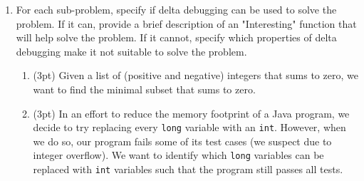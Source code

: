 \documentclass{report}
\newif\ifkey
\newcommand{\answerlong}[1]{\ifkey\color{red}\textbf{#1}\color{black}\else\vspace{0.5in}\fi\xspace}
\newcommand*{\pts}[1]{\addtocounter{points}{#1}(#1pt)}
\begin{document}
\begin{spacing}{1.4}
\begin{enumerate}[leftmargin=*]
\begin{enumerate}
  \item \pts{4} Describe, in one sentence each, two risks associated with Radhia's proposal.\\
    \answerlong{Any two of the following sentences would be a good answer (other answers are possible).
      Reducing integration testing may increase the risk that bugs at the boundary between modules are not detected.
      Static analysis may produce too many false positive alarms.
      Static analysis may be unsound or may miss bugs (even of the kind it is supposed to find).
      Static analysis errors may be too hard to understand.
    }
    \end{enumerate}

  \item For each sub-problem, specify if delta debugging can be used
    to solve the problem. If it can, provide a brief description of an "Interesting" function that will help solve the problem. If it
    cannot, specify which properties of delta debugging make it not suitable to solve the problem.
    \begin{enumerate}

    \item \pts{3} Given a list of (positive and negative) integers that sums to zero, we want to find the minimal subset that sums to zero.\\
      \answerlong{Delta debugging is not suitable for this use case: integer summation is ambiguous.}

    \item \pts{3} In an effort to reduce the memory footprint of a Java program, we decide to try replacing
      every \lstinline{long} variable with an \lstinline{int}. However, when we do so, our program fails some of its test cases (we suspect due to integer overflow). We want to
      identify which \lstinline{long} variables can be replaced with \lstinline{int} variables such that the program still passes all tests.\\
      \answerlong{Delta debugging is suitable for this use case. We can define script is_interesting.sh such that it takes a
        list of occurrences of long and replaces each with an int. The script exits 1 if the code compiles and runs the tests
        successfully, and it exits 0 if the code doesn't compile or fails any tests.}


\end{enumerate}
\end{enumerate}
\end{spacing}
\end{document}

